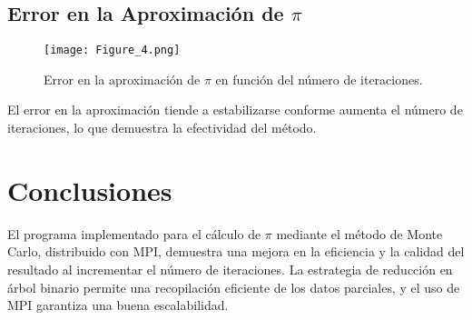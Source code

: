 \documentclass[conference, a4paper]{IEEEtran}
\begin{document}
\subsection{Error en la Aproximación de \(\pi\)}
\begin{figure}[h!]
    \centering
    \texttt{[image: Figure\_4.png]}
    \caption{Error en la aproximación de \(\pi\) en función del número de iteraciones.}
    \label{fig:error}
\end{figure}
El error en la aproximación tiende a estabilizarse conforme aumenta el número de iteraciones, lo que demuestra la efectividad del método.

\section{Conclusiones}
El programa implementado para el cálculo de \(\pi\) mediante el método de Monte Carlo, distribuido con MPI, demuestra una mejora en la eficiencia y la calidad del resultado al incrementar el número de iteraciones. La estrategia de reducción en árbol binario permite una recopilación eficiente de los datos parciales, y el uso de MPI garantiza una buena escalabilidad.




\end{document}
